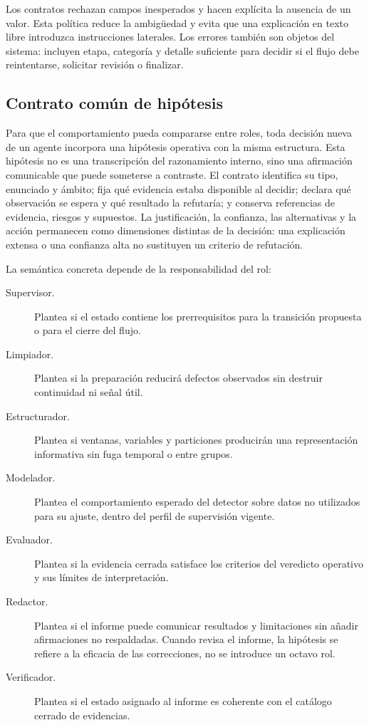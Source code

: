 Los contratos rechazan campos inesperados y hacen explícita la ausencia de un
valor. Esta política reduce la ambigüedad y evita que una explicación en texto
libre introduzca instrucciones laterales. Los errores también son objetos del
sistema: incluyen etapa, categoría y detalle suficiente para decidir si el
flujo debe reintentarse, solicitar revisión o finalizar.

\subsection{Contrato común de hipótesis}

Para que el comportamiento pueda compararse entre roles, toda decisión nueva
de un agente incorpora una hipótesis operativa con la misma estructura. Esta
hipótesis no es una transcripción del razonamiento interno, sino una afirmación
comunicable que puede someterse a contraste. El contrato identifica su tipo,
enunciado y ámbito; fija qué evidencia estaba disponible al decidir; declara
qué observación se espera y qué resultado la refutaría; y conserva referencias
de evidencia, riesgos y supuestos. La justificación, la confianza, las
alternativas y la acción permanecen como dimensiones distintas de la decisión:
una explicación extensa o una confianza alta no sustituyen un criterio de
refutación.

La semántica concreta depende de la responsabilidad del rol:

\begin{description}
  \item[Supervisor.] Plantea si el estado contiene los prerrequisitos para la
        transición propuesta o para el cierre del flujo.
  \item[Limpiador.] Plantea si la preparación reducirá defectos observados sin
        destruir continuidad ni señal útil.
  \item[Estructurador.] Plantea si ventanas, variables y particiones producirán
        una representación informativa sin fuga temporal o entre grupos.
  \item[Modelador.] Plantea el comportamiento esperado del detector sobre datos
        no utilizados para su ajuste, dentro del perfil de supervisión vigente.
  \item[Evaluador.] Plantea si la evidencia cerrada satisface los criterios del
        veredicto operativo y sus límites de interpretación.
  \item[Redactor.] Plantea si el informe puede comunicar resultados y
        limitaciones sin añadir afirmaciones no respaldadas. Cuando revisa el
        informe, la hipótesis se refiere a la eficacia de las correcciones, no
        se introduce un octavo rol.
  \item[Verificador.] Plantea si el estado asignado al informe es coherente con
        el catálogo cerrado de evidencias.
\end{description}

